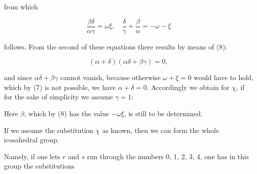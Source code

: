 from which

\[
\frac{\beta\delta}{\alpha\gamma} = \omega\xi, \quad \frac{\delta}{\gamma} + \frac{\beta}{\alpha} = -\omega - \xi
\]

follows. From the second of these equations there results by means of (8):

\[
(\alpha + \delta)(\alpha\delta + \beta\gamma) = 0,
\]

and since $\alpha\delta + \beta\gamma$ cannot vanish, because otherwise $\omega + \xi = 0$
would have to hold, which by (7) is not possible, we have $\alpha + \delta = 0$.
Accordingly we obtain for $\chi$, if for the sake of simplicity we assume
$\gamma = 1$:


Here $\beta$, which by (8) has the value $-\omega\xi$, is still to be
determined.

If we assume the substitution $\chi$ as known, then
we can form the whole icosahedral group.

Namely, if one lets $r$ and $s$ run through the numbers 0, 1, 2, 3, 4,
one has in this group the substitutions

